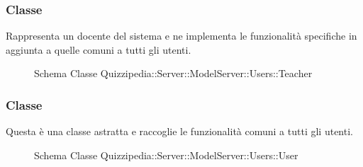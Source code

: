 \subsubsection{Classe }
Rappresenta un docente del sistema e ne implementa le funzionalità specifiche in aggiunta a quelle comuni a tutti gli utenti.
\begin{figure}[H]
\centering
\noindent{}
\caption[Schema Classe Teacher]{Schema Classe Quizzipedia::Server::ModelServer::Users::Teacher}
\end{figure}
\subsubsection{Classe }
Questa è una classe astratta e raccoglie le funzionalità comuni a tutti gli utenti.
\begin{figure}[H]
\centering
\noindent{}
\caption[Schema Classe User]{Schema Classe Quizzipedia::Server::ModelServer::Users::User}
\end{figure}
